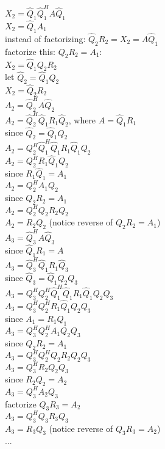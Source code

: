 \documentclass[8pt,letter]{article}
\begin{document}
\begin{multicols*}{2}
    $X_2 = \hat{Q}_1 \hat{Q}_1^H A \hat{Q}_1$\\
    $X_2 = \hat{Q}_1 A_1$\\

    instead of factorizing: $\hat{Q}_2 R_2 = X_2 = A \hat{Q}_1$\\
    factorize this: $Q_2 R_2 = A_1$:\\
    $X_2 = \hat{Q}_1 Q_2 R_2$\\
    let $\hat{Q}_2 = \hat{Q}_1 Q_2$\\
    $X_2 = \hat{Q}_2 R_2$\\

    $A_2 = \hat{Q}_2^H A \hat{Q}_2$\\
    $A_2 = \hat{Q}_2^H \hat{Q}_1 R_1 \hat{Q}_2$, where $A = \hat{Q}_1 R_1$\\
    since $\hat{Q}_2 = \hat{Q}_1 Q_2$\\
    $A_2 = Q_2^H \hat{Q}_1^H \hat{Q}_1 R_1 \hat{Q}_1 Q_2$\\
    $A_2 = Q_2^H R_1 \hat{Q}_1 Q_2$\\    
    since $R_1 \hat{Q}_1 = A_1$\\
    $A_2 = Q_2^H A_1 Q_2$\\
    since $Q_2 R_2 = A_1$\\
    $A_2 = Q_2^H Q_2 R_2 Q_2$\\
    $A_2 = R_2 Q_2$ (notice reverse of $Q_2 R_2 = A_1$)\\

    $A_3 = \hat{Q}_3^H A \hat{Q}_3$\\
    since $\hat{Q}_1 R_1 = A$\\
    $A_3 = \hat{Q}_3^H \hat{Q}_1 R_1 \hat{Q}_3$\\
    since $\hat{Q}_3 = \hat{Q}_1 Q_2 Q_3$\\
    $A_3 = Q_3^H Q_2^H \hat{Q}_1^H \hat{Q}_1 R_1 \hat{Q}_1 Q_2 Q_3$\\
    $A_3 = Q_3^H Q_2^H  R_1 \hat{Q}_1 Q_2 Q_3$\\
    since $A_1 = R_1 \hat{Q}_1$\\
    $A_3 = Q_3^H Q_2^H  A_1 Q_2 Q_3$\\
    since $Q_2 R_2 = A_1$\\
    $A_3 = Q_3^H Q_2^H Q_2 R_2 Q_2 Q_3$\\
    $A_3 = Q_3^H R_2 Q_2 Q_3$\\
    since $R_2 Q_2 = A_2$\\
    $A_3 = Q_3^H A_2 Q_3$\\
    factorize $Q_3 R_3 = A_2$\\
    $A_3 = Q_3^H Q_3 R_3 Q_3$\\
    $A_3 = R_3 Q_3$ (notice reverse of $Q_3 R_3 = A_2$)\\
    ...\\


\end{multicols*}
\end{document}
